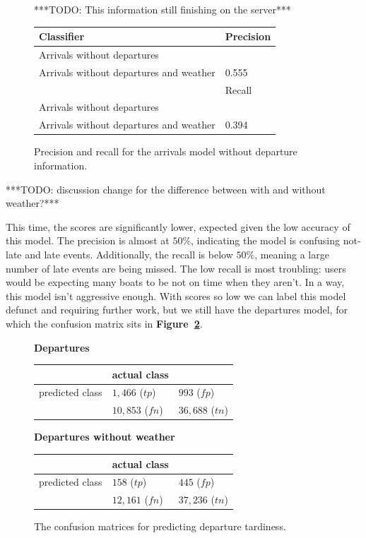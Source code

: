 \documentclass[11pt]{article} %
\begin{document}
\begin{figure}
    ***TODO: This information still finishing on the server***

    \begin{tabular}{l|l}
         Classifier & Precision\\
         \hline
         Arrivals without departures & \\
         Arrivals without departures and weather & 0.555\\
         \hline
          & Recall\\
         \hline
         Arrivals without departures & \\
         Arrivals without departures and weather& 0.394\\
    \end{tabular}
    \caption{Precision and recall for the arrivals model without departure 
    information.}
    \label{fig:pr_arrivals_nod}
\end{figure}

***TODO: discussion change for the difference between with and without weather?***

This time, the scores are significantly lower, expected given the low accuracy
of this model. The precision is almost at $50\%$, indicating the model is
confusing not-late and late events. Additionally, the recall is below 
$50\%$, meaning a large number of late events are being missed. The low recall
is most troubling: users would be expecting many boats to be not on time when
they aren't. In a way, this model isn't aggressive enough. With scores
so low we can label this model defunct and requiring further work, but
we still have the departures model, for which the confusion matrix sits in
\textbf{Figure~\ref{fig:confusion_departures}}.


\begin{figure}
    \textbf{Departures}

    \begin{tabular}[h]{l|ll}
                         & actual class &  \\
         \hline
         predicted class & $1,466$ ($tp$)& $993$ ($fp$)\\
                         & $10,853$ ($fn$)& $36,688$ ($tn$)\\
    \end{tabular}

    \textbf{Departures without weather}

    \begin{tabular}[h]{l|ll}
                         & actual class &  \\
         \hline
         predicted class & $158$ ($tp$)& $445$ ($fp$)\\
                         & $12,161$ ($fn$)& $37,236$ ($tn$)\\
    \end{tabular}
    \caption{The confusion matrices for predicting departure tardiness.}
    \label{fig:confusion_departures}
\end{figure}
\end{document}
